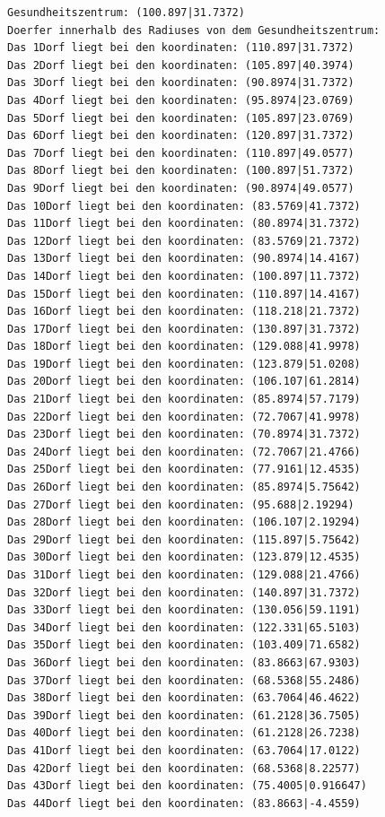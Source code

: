 \documentclass{article}
\begin{document}
\begin{verbatim}
Gesundheitszentrum: (100.897|31.7372)
Doerfer innerhalb des Radiuses von dem Gesundheitszentrum: 
Das 1Dorf liegt bei den koordinaten: (110.897|31.7372)
Das 2Dorf liegt bei den koordinaten: (105.897|40.3974)
Das 3Dorf liegt bei den koordinaten: (90.8974|31.7372)
Das 4Dorf liegt bei den koordinaten: (95.8974|23.0769)
Das 5Dorf liegt bei den koordinaten: (105.897|23.0769)
Das 6Dorf liegt bei den koordinaten: (120.897|31.7372)
Das 7Dorf liegt bei den koordinaten: (110.897|49.0577)
Das 8Dorf liegt bei den koordinaten: (100.897|51.7372)
Das 9Dorf liegt bei den koordinaten: (90.8974|49.0577)
Das 10Dorf liegt bei den koordinaten: (83.5769|41.7372)
Das 11Dorf liegt bei den koordinaten: (80.8974|31.7372)
Das 12Dorf liegt bei den koordinaten: (83.5769|21.7372)
Das 13Dorf liegt bei den koordinaten: (90.8974|14.4167)
Das 14Dorf liegt bei den koordinaten: (100.897|11.7372)
Das 15Dorf liegt bei den koordinaten: (110.897|14.4167)
Das 16Dorf liegt bei den koordinaten: (118.218|21.7372)
Das 17Dorf liegt bei den koordinaten: (130.897|31.7372)
Das 18Dorf liegt bei den koordinaten: (129.088|41.9978)
Das 19Dorf liegt bei den koordinaten: (123.879|51.0208)
Das 20Dorf liegt bei den koordinaten: (106.107|61.2814)
Das 21Dorf liegt bei den koordinaten: (85.8974|57.7179)
Das 22Dorf liegt bei den koordinaten: (72.7067|41.9978)
Das 23Dorf liegt bei den koordinaten: (70.8974|31.7372)
Das 24Dorf liegt bei den koordinaten: (72.7067|21.4766)
Das 25Dorf liegt bei den koordinaten: (77.9161|12.4535)
Das 26Dorf liegt bei den koordinaten: (85.8974|5.75642)
Das 27Dorf liegt bei den koordinaten: (95.688|2.19294)
Das 28Dorf liegt bei den koordinaten: (106.107|2.19294)
Das 29Dorf liegt bei den koordinaten: (115.897|5.75642)
Das 30Dorf liegt bei den koordinaten: (123.879|12.4535)
Das 31Dorf liegt bei den koordinaten: (129.088|21.4766)
Das 32Dorf liegt bei den koordinaten: (140.897|31.7372)
Das 33Dorf liegt bei den koordinaten: (130.056|59.1191)
Das 34Dorf liegt bei den koordinaten: (122.331|65.5103)
Das 35Dorf liegt bei den koordinaten: (103.409|71.6582)
Das 36Dorf liegt bei den koordinaten: (83.8663|67.9303)
Das 37Dorf liegt bei den koordinaten: (68.5368|55.2486)
Das 38Dorf liegt bei den koordinaten: (63.7064|46.4622)
Das 39Dorf liegt bei den koordinaten: (61.2128|36.7505)
Das 40Dorf liegt bei den koordinaten: (61.2128|26.7238)
Das 41Dorf liegt bei den koordinaten: (63.7064|17.0122)
Das 42Dorf liegt bei den koordinaten: (68.5368|8.22577)
Das 43Dorf liegt bei den koordinaten: (75.4005|0.916647)
Das 44Dorf liegt bei den koordinaten: (83.8663|-4.4559)

\end{verbatim}
\end{document}
